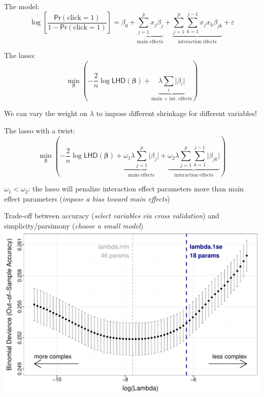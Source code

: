 \documentclass[11pt,xcolor=svgnames]{beamer}
\newcommand{\fg}{\color{ForestGreen}}
\newcommand{\nv}{\color{Navy}}
\newcommand{\bm}[1]{\mathbf{#1}}
\begin{document}
\begin{frame}

The model:
\[ \log\left[\frac{\textsf{Pr}(\text{click}=1)}{1-\textsf{Pr}(\text{click}=1)}\right] = \beta_0 + \underbrace{\sum_{j=1}^{p} x_j \beta_j}_{\text{main effects}} + \underbrace{\sum_{j=1}^p \sum_{k=1}^{j-1} x_j x_k \beta_{jk}}_{\text{interaction effects}} + \varepsilon \]

The lasso:
\[ \min_{\bm{\beta}} \left(-\frac{2}{n}\log{\textsf{LHD}(\bm{\beta})} + \underbrace{\lambda \sum_{i} \vert \beta_i \vert}_{\text{main + int. effects}} \right) \]

\vskip 0.25cm \nv 
We can vary the weight on $\lambda$ to impose different shrinkage for different variables!

\end{frame}

\begin{frame}

The lasso with a twist:
\[ \min_{\bm{\beta}} \left(-\frac{2}{n}\log{\textsf{LHD}(\bm{\beta})} + \underbrace{\omega_1 \lambda \sum_{j=1}^{p} \vert \beta_j \vert}_{\text{main effects}} + \underbrace{\omega_2 \lambda \sum_{j=1}^p \sum_{k=1}^{j-1} \vert \beta_{jk} \vert}_{\text{interaction effects}} \right) \]

\vskip 0.5cm 
$\omega_1 < \omega_2$: the lasso will penalize interaction effect parameters more than main effect parameters (\textit{\fg impose a bias toward main effects})

\end{frame}


\begin{frame}
Trade-off between accuracy (\textit{\fg select variables via cross validation}) and simplicity/parsimony (\textit{\fg choose a small model})
\includegraphics[width=\textwidth]{regpath2.pdf}
\end{frame}
\end{document}
